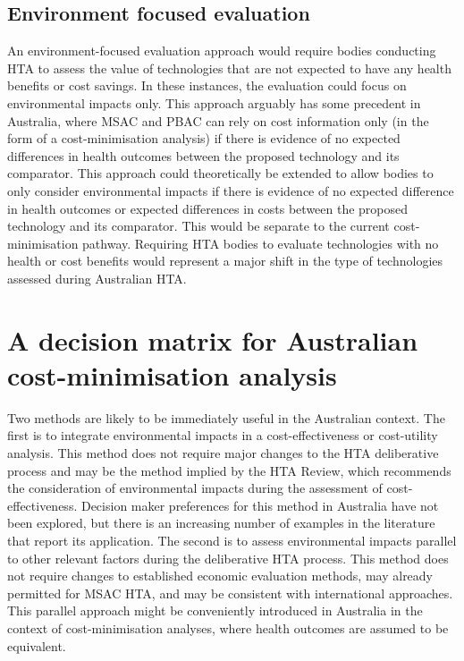 \begin{refsection}
\subsection{Environment focused evaluation}
An environment-focused evaluation approach would require bodies conducting HTA to assess the value of technologies that are not expected to have any health benefits or cost savings. In these instances, the evaluation could focus on environmental impacts only.\cite{toolan_environmental_2023} This approach arguably has some precedent in Australia, where MSAC and PBAC can rely on cost information only (in the form of a cost-minimisation analysis) if there is evidence of no expected differences in health outcomes between the proposed technology and its comparator. This approach could theoretically be extended to allow bodies to only consider environmental impacts if there is evidence of no expected difference in health outcomes or expected differences in costs between the proposed technology and its comparator. This would be separate to the current cost-minimisation pathway. Requiring HTA bodies to evaluate technologies with no health or cost benefits would represent a major shift in the type of technologies assessed during Australian HTA.

\section{A decision matrix for Australian cost-minimisation analysis }
Two methods are likely to be immediately useful in the Australian context. The first is to integrate environmental impacts in a cost-effectiveness or cost-utility analysis. This method does not require major changes to the HTA deliberative process and may be the method implied by the HTA Review, which recommends the consideration of environmental impacts during the assessment of cost-effectiveness. Decision maker preferences for this method in Australia have not been explored, but there is an increasing number of examples in the literature that report its application. The second is to assess environmental impacts parallel to other relevant factors during the deliberative HTA process. This method does not require changes to established economic evaluation methods, may already permitted for MSAC HTA, and may be consistent with international approaches. This parallel approach might be conveniently introduced in Australia in the context of cost-minimisation analyses, where health outcomes are assumed to be equivalent. 


\end{refsection}
